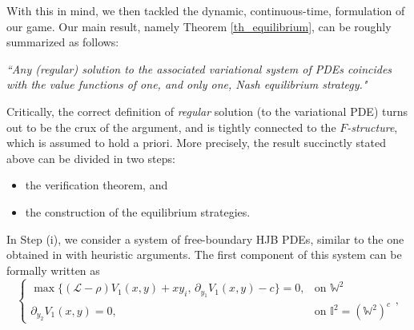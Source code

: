 \documentclass[10pt]{article}
\numberwithin{equation}{section}
\theoremstyle{plain}
\numberwithin{theorem}{section}
\theoremstyle{definition}
\def \R {\mathbb{R}}
\def \p {\partial}
\newcommand{\<}{\langle}
\renewcommand{\>}{\rangle}
\renewcommand{\(}{\left(}
\renewcommand{\)}{\right)}
\def \R  {{\mathbb {R}}}
\def \p {{\partial}}
\def \R {{\mathbb {R}}}
\def\cL{{\mathcal L}}
\begin{document}
{With this in mind, we then tackled the dynamic, continuous-time, formulation of our game. Our main result, namely Theorem \ref{th_equilibrium}, can be roughly summarized as follows:
\begin{center}
\emph{``Any (\emph{regular}) solution to the associated variational system of PDEs coincides with the value functions of one, and only one, Nash equilibrium strategy."}
\end{center}
Critically, the correct definition of \emph{regular} solution (to the variational PDE) turns out to be the crux of the argument, and is tightly connected to the \emph{$F$-structure}, which is assumed to hold a priori. More precisely, the result succinctly stated above can be divided in two steps: 
\begin{itemize}
\item[(i)] the verification theorem, and 
\item[(ii)] the construction of the equilibrium strategies.
\end{itemize}
In Step (i), %
 we consider a system of free-boundary HJB PDEs, similar to the one obtained in \cite{MR4352705} with heuristic arguments. The first component of this system %
 can be formally written as
 \begin{equation}\label{HJB_bis_form}
\begin{cases}
\max\{(\cL-\rho)V_1(x,y)+xy_i,\, \p_{y_1}V_1(x,y)-c\}=0, & \text{on }\mathbb{W}^2 \\  %
\p_{y_2}V_1(x,y) = 0, & \text{on }\mathbb{I}^2 =  (\mathbb{W}^2)^c %
\end{cases}, 
\end{equation}
}
\end{document}
